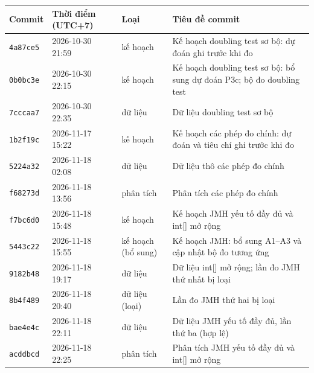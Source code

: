 \setlength{\tabcolsep}{3pt}
\begin{tabularx}{\linewidth}{lllX}
\toprule
Commit & Thời điểm (UTC+7) & Loại & Tiêu đề commit \\
\midrule
\texttt{4a87ce5} & 2026-10-30 21:59 & kế hoạch & Kế hoạch doubling test sơ bộ: dự đoán ghi trước khi đo \\
\texttt{0b0bc3e} & 2026-10-30 22:15 & kế hoạch & Kế hoạch doubling test sơ bộ: bổ sung dự đoán P3c; bộ đo doubling test \\
\texttt{7cccaa7} & 2026-10-30 22:35 & dữ liệu & Dữ liệu doubling test sơ bộ \\
\texttt{1b2f19c} & 2026-11-17 15:22 & kế hoạch & Kế hoạch các phép đo chính: dự đoán và tiêu chí ghi trước khi đo \\
\texttt{5224a32} & 2026-11-18 02:08 & dữ liệu & Dữ liệu thô các phép đo chính \\
\texttt{f68273d} & 2026-11-18 13:56 & phân tích & Phân tích các phép đo chính \\
\texttt{f7bc6d0} & 2026-11-18 15:48 & kế hoạch & Kế hoạch JMH yếu tố đầy đủ và int[] mở rộng \\
\texttt{5443c22} & 2026-11-18 15:55 & kế hoạch (bổ sung) & Kế hoạch JMH: bổ sung A1–A3 và cập nhật bộ đo tương ứng \\
\texttt{9182b48} & 2026-11-18 19:17 & dữ liệu & Dữ liệu int[] mở rộng; lần đo JMH thứ nhất bị loại \\
\texttt{8b4f489} & 2026-11-18 20:40 & dữ liệu (loại) & Lần đo JMH thứ hai bị loại \\
\texttt{bae4e4c} & 2026-11-18 22:11 & dữ liệu & Dữ liệu JMH yếu tố đầy đủ, lần thứ ba (hợp lệ) \\
\texttt{acddbcd} & 2026-11-18 22:25 & phân tích & Phân tích JMH yếu tố đầy đủ và int[] mở rộng \\
\bottomrule
\end{tabularx}
